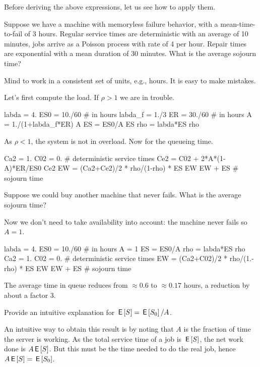 Before deriving the above expressions, let us see how to apply them. 

\begin{exercise}
 Suppose we have a machine with memoryless failure behavior, with a mean-time-to-fail of $3$ hours. Regular service times are deterministic with an average of 10 minutes, jobs arrive as a Poisson process with rate of 4 per hour. Repair times are exponential with a mean duration of 30 minutes. What is the average sojourn time?
\begin{hint}
 Mind to work in a consistent set of units, e.g., hours. It is easy to make mistakes. 
\end{hint}
\begin{solution}
Let's first compute the load. If $\rho>1$ we are in trouble.
 \begin{pyconsole}
labda = 4.
ES0 = 10./60 # in hours
labda_f = 1./3
ER = 30./60 # in hours
A = 1./(1+labda_f*ER)
A
ES = ES0/A
ES
rho = labda*ES
rho
 \end{pyconsole}
As $\rho<1$, the system is not in overload. Now for the queueing time.
\begin{pyconsole}
Ca2 = 1.
C02 = 0. # deterministic service times
Ce2 = C02 + 2*A*(1-A)*ER/ES0
Ce2
EW = (Ca2+Ce2)/2 * rho/(1-rho) * ES
EW
EW + ES # sojourn time
\end{pyconsole}
\end{solution}
\end{exercise}

\begin{extra}
 Suppose we could buy another machine that never fails. What is the average sojourn time?
\begin{solution}
Now we don't need to take availability into account: the machine never fails so $A=1$. 
 \begin{pyconsole}
labda = 4.
ES0 = 10./60 # in hours
A = 1
ES = ES0/A
rho = labda*ES
rho
Ca2 = 1.
C02 = 0. # deterministic service times
EW = (Ca2+C02)/2 * rho/(1.-rho) * ES
EW
EW + ES # sojourn time
\end{pyconsole}
The average time in queue reduces from $\approx 0.6$ to $\approx 0.17$ hours, a reduction by about a factor 3. 
\end{solution}
\end{extra}

\begin{extra}
 Provide an intuitive explanation for $\,\mathsf{E}\left[S\right] = \,\mathsf{E}\left[S_0\right]/A$.
\begin{solution}
An intuitive way to obtain this result is by noting that $A$ is the fraction of time the server is working. As the total service time of a job is $\,\mathsf{E}\left[S\right]$, the net work done is $ A\,\mathsf{E}\left[S\right]$. But this must be the time needed to do the real job, hence $A \,\mathsf{E}\left[S\right] = \,\mathsf{E}\left[S_0\right]$. 
\end{solution}
\end{extra}



